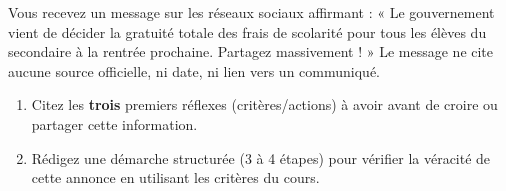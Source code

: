 \documentclass[11pt]{article}
\begin{document}
\begin{exercice}
Vous recevez un message sur les réseaux sociaux affirmant : « Le gouvernement vient de décider la gratuité totale des frais de scolarité pour tous les élèves du secondaire à la rentrée prochaine. Partagez massivement ! » Le message ne cite aucune source officielle, ni date, ni lien vers un communiqué.
\begin{enumerate}
    \item Citez les \textbf{trois} premiers réflexes (critères/actions) à avoir avant de croire ou partager cette information.
    \item Rédigez une démarche structurée (3 à 4 étapes) pour vérifier la véracité de cette annonce en utilisant les critères du cours.
\end{enumerate}
\end{exercice}
\end{document}
